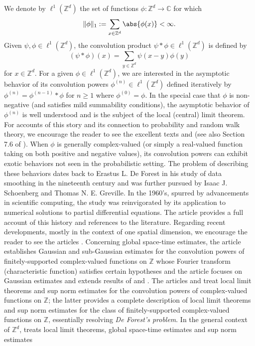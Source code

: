 \documentclass[11pt, letter]{book}
\begin{document}
\noindent We denote by $\ell^1(\mathbb{Z}^d)$ the set of functions $\phi:\mathbb{Z}^d\to\mathbb{C}$ for which
\begin{equation*}
\|\phi\|_1:=\sum_{x\in\mathbb{Z}^d}\abs{\phi(x)}<\infty.
\end{equation*}
Given $\psi,\phi\in \ell^1(\mathbb{Z}^d)$, the convolution product $\psi\ast\phi\in\ell^1(\mathbb{Z}^d)$ is defined by
\begin{equation*}
\left(\psi\ast\phi\right)(x)=\sum_{y\in\mathbb{Z}^d}\psi(x-y)\phi(y)
\end{equation*}
for $x\in\mathbb{Z}^d$. For a given $\phi\in\ell^1(\mathbb{Z}^d)$, we are interested in the asymptotic behavior of its convolution powers $\phi^{(n)}\in\ell^1(\mathbb{Z}^d)$ defined iteratively by $\phi^{(n)}=\phi^{(n-1)}\ast\phi$ for $n\geq 1$ where $\phi^{(0)}=\phi$. In the special case that $\phi$ is non-negative (and satisfies mild summability conditions), the asymptotic behavior of $\phi^{(n)}$ is well understood and is the subject of the local (central) limit theorem. For accounts of this story and its connection to probability and random walk theory, we encourage the reader to see the excellent texts \cite{lawler_random_2010} and \cite{spitzer_principles_1964} (see also Section 7.6 of \cite{randles_convolution_2017}). When $\phi$ is generally complex-valued (or simply a real-valued function taking on both positive and negative values), its convolution powers can exhibit exotic behaviors not seen in the probabilistic setting. The problem of describing these behaviors dates back to Erastus L. De Forest in his study of data smoothing in the nineteenth century and was further pursued by Isaac J. Schoenberg and Thomas N. E.  Greville. In the 1960's, spurred by advancements in scientific computing, the study was reinvigorated by its application to numerical solutions to partial differential equations. The article \cite{diaconis_convolution_2014} provides a full account of this history and references to the literature. Regarding recent developments, mostly in the context of one spatial dimension, we encourage the reader to see the articles \cite{diaconis_convolution_2014,randles_convolution_2015, coulombel2020generalized, randles_convolution_2017}. Concerning global space-time estimates, the article \cite{diaconis_convolution_2014} establishes Gaussian and sub-Gaussian estimates for the convolution powers of finitely-supported complex-valued functions on $\mathbb{Z}$ whose Fourier transform (characteristic function) satisfies certain hypotheses and the article \cite{coulombel2020generalized} focuses on Gaussian estimates and extends results of \cite{diaconis_convolution_2014} and \cite{randles_convolution_2017}. The articles \cite{diaconis_convolution_2014} and \cite{randles_convolution_2015} treat local limit theorems and sup norm estimates for the convolution powers of complex-valued functions on $\mathbb{Z}$; the latter provides a complete description of local limit theorems and sup norm estimates for the class of finitely-supported complex-valued functions on $\mathbb{Z}$, essentially resolving \textit{De Forest's problem}. In the general context of $\mathbb{Z}^d$, \cite{randles_convolution_2017} treats local limit theorems, global space-time estimates and sup norm estimates 
\end{document}

